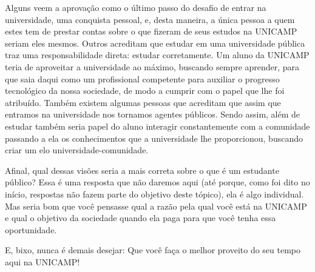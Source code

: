 Alguns veem a aprovação como o último passo do desafio de entrar na
universidade, uma conquista pessoal, e, desta maneira, a única pessoa a quem
estes tem de prestar contas sobre o que fizeram de seus estudos na UNICAMP
seriam eles mesmos. Outros acreditam que estudar em uma universidade pública
traz uma responsabilidade direta: estudar corretamente. Um aluno da UNICAMP
teria de aproveitar a universidade ao máximo, buscando sempre aprender, para que
saia daqui como um profissional competente para auxiliar o progresso tecnológico
da nossa sociedade, de modo a cumprir com o papel que lhe foi atribuído. Também
existem algumas pessoas que acreditam que assim que entramos na universidade nos
tornamos agentes públicos. Sendo assim, além de estudar também seria papel do
aluno interagir constantemente com a comunidade passando a ela os conhecimentos
que a universidade lhe proporcionou, buscando criar um elo
universidade-comunidade.

Afinal, qual dessas visões seria a mais correta sobre o que é um estudante
público? Essa é uma resposta que não daremos aqui (até porque, como foi dito no
início, respostas não fazem parte do objetivo deste tópico), ela é algo
individual. Mas seria bom que você pensasse qual a razão pela qual você está na
UNICAMP e qual o objetivo da sociedade quando ela paga para que você tenha essa
oportunidade.

E, bixo, nunca é demais desejar: Que você faça o melhor proveito do seu tempo
aqui na UNICAMP!
